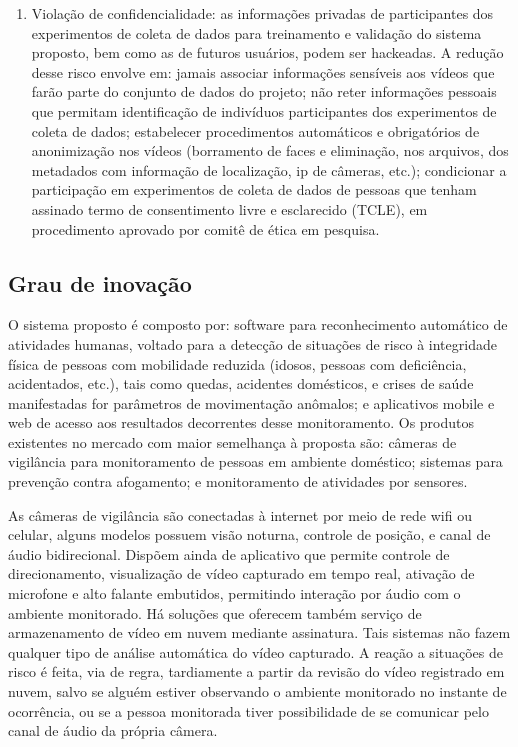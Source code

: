 \begin{enumerate}
	\item Violação de confidencialidade: as informações privadas de participantes dos experimentos de coleta de dados para treinamento e validação do sistema proposto, bem como as de futuros usuários, podem ser hackeadas. A redução desse risco envolve em: jamais associar informações sensíveis aos vídeos que farão parte do conjunto de dados do projeto; não reter informações pessoais que permitam identificação de indivíduos participantes dos experimentos de coleta de dados; estabelecer procedimentos automáticos e obrigatórios de anonimização nos vídeos (borramento de faces e eliminação, nos arquivos, dos metadados com informação de localização, ip de câmeras, etc.); condicionar a participação em experimentos de coleta de dados de pessoas que tenham assinado termo de consentimento livre e esclarecido (TCLE), em procedimento aprovado por comitê de ética em pesquisa.
\end{enumerate}


\subsection{Grau de inovação}
\label{ssec:inova}
O sistema proposto é composto por: software para reconhecimento automático de atividades humanas, voltado para a detecção de situações de risco à integridade física de pessoas com mobilidade reduzida (idosos, pessoas com deficiência, acidentados, etc.), tais como quedas, acidentes domésticos, e crises de saúde manifestadas for parâmetros de movimentação anômalos; e aplicativos mobile e web de acesso aos resultados decorrentes desse monitoramento. 
Os produtos existentes no mercado com maior semelhança à proposta são: câmeras de vigilância para monitoramento de pessoas em ambiente doméstico; sistemas para prevenção contra afogamento; e monitoramento de atividades por sensores. 

As câmeras de vigilância são conectadas à internet por meio de rede wifi ou celular, alguns modelos possuem visão noturna, controle de posição, e canal de áudio bidirecional. Dispõem ainda de aplicativo que permite controle de direcionamento, visualização de vídeo capturado em tempo real, ativação de microfone e alto falante embutidos, permitindo interação por áudio com o ambiente monitorado. Há soluções que oferecem também serviço de armazenamento de vídeo em nuvem mediante assinatura. Tais sistemas não fazem qualquer tipo de análise automática do vídeo capturado. A reação a situações de risco é feita, via de regra, tardiamente a partir da revisão do vídeo registrado em nuvem, salvo se alguém estiver observando o ambiente monitorado no instante de ocorrência, ou se a pessoa monitorada tiver possibilidade de se comunicar pelo canal de áudio da própria câmera. 

